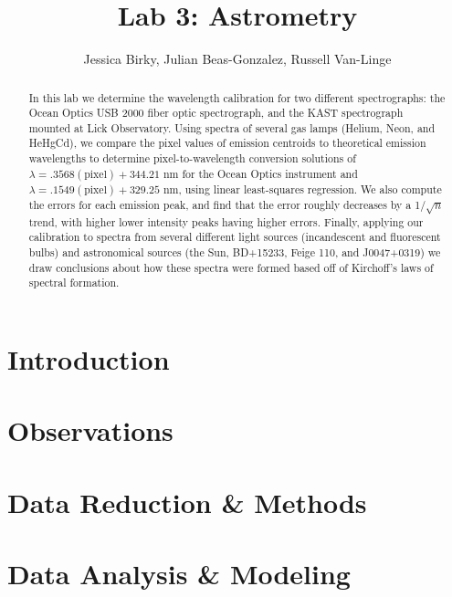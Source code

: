 \documentclass[preprint]{aastex62}
\begin{document}
\title{\sc Lab 3: Astrometry}
\author{Jessica Birky, Julian Beas-Gonzalez, Russell Van-Linge}


\begin{abstract}
In this lab we determine the wavelength calibration for two different spectrographs: the Ocean Optics USB 2000 fiber optic spectrograph, and the KAST spectrograph mounted at Lick Observatory. Using spectra of several gas lamps (Helium, Neon, and HeHgCd), we compare the pixel values of emission centroids to theoretical emission wavelengths to determine pixel-to-wavelength conversion solutions of $\lambda=.3568(\mathrm{pixel})+344.21$ nm for the Ocean Optics instrument and  $\lambda=.1549(\mathrm{pixel})+329.25$ nm, using linear least-squares regression. We also compute the errors for each emission peak, and find that the error roughly decreases by a 1/$\sqrt{n}$ trend, with higher lower intensity peaks having higher errors. Finally, applying our calibration to spectra from several different light sources (incandescent and fluorescent bulbs) and astronomical sources (the Sun, BD+15233, Feige 110, and J0047+0319) we draw conclusions about how these spectra were formed based off of Kirchoff's laws of spectral formation.

\end{abstract}
\bigskip

\section{Introduction} 


\section{Observations} \label{sec:observations}


\section{Data Reduction \& Methods} \label{sec:methods}


\section{Data Analysis \& Modeling} \label{sec:analysis}


\end{document}
